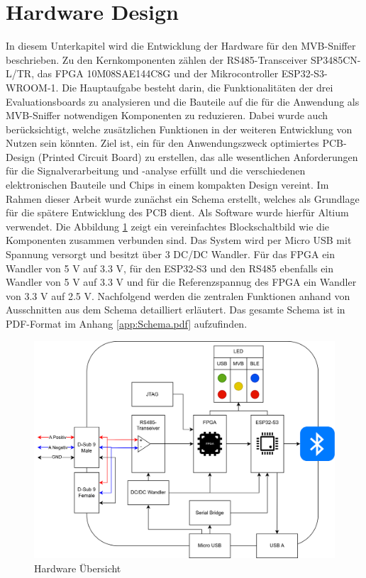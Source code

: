 
\section{Hardware Design}
\label{sec:Hardware Design}

In diesem Unterkapitel wird die Entwicklung der Hardware für den MVB-Sniffer beschrieben. Zu den Kernkomponenten zählen der RS485-Transceiver SP3485CN-L/TR, das FPGA 10M08SAE144C8G und der Mikrocontroller ESP32-S3-WROOM-1. Die Hauptaufgabe besteht darin, die Funktionalitäten der drei Evaluationsboards zu analysieren und die Bauteile auf die für die Anwendung als MVB-Sniffer notwendigen Komponenten zu reduzieren. Dabei wurde auch berücksichtigt, welche zusätzlichen Funktionen in der weiteren Entwicklung von Nutzen sein könnten. Ziel ist, ein für den Anwendungszweck optimiertes PCB-Design (Printed Circuit Board) zu erstellen, das alle wesentlichen Anforderungen für die Signalverarbeitung und -analyse erfüllt und die verschiedenen elektronischen Bauteile und Chips in einem kompakten Design vereint. Im Rahmen dieser Arbeit wurde zunächst ein Schema erstellt, welches als Grundlage für die spätere Entwicklung des PCB dient. Als Software wurde hierfür Altium verwendet. Die Abbildung \ref{fig:Hardware Übersicht} zeigt ein vereinfachtes Blockschaltbild wie die Komponenten zusammen verbunden sind. Das System wird per Micro USB mit Spannung versorgt und besitzt über 3 DC/DC Wandler. Für das FPGA  ein Wandler von 5 V auf 3.3 V, für den ESP32-S3 und den RS485 ebenfalls ein Wandler von 5 V auf 3.3 V und für die Referenzspannug des FPGA ein Wandler von 3.3 V auf 2.5 V. Nachfolgend werden die zentralen Funktionen anhand von Ausschnitten aus dem Schema detailliert erläutert. Das gesamte Schema ist in PDF-Format im Anhang \ref{app:Schema.pdf} aufzufinden.

\begin{figure}[H]
    \centering
    \includegraphics[width=0.8\linewidth]{Figures/Chap3/Schematics/Aufbau_Hardware_Sniffer.drawio.png}
    \caption{Hardware Übersicht}
    \label{fig:Hardware Übersicht}
\end{figure}


